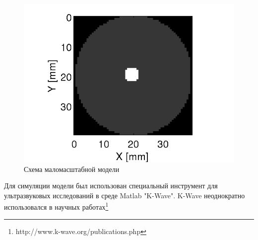 \documentclass[14pt]{matmex-diploma}
\begin{document}
\begin{figure}[h]
\centering
    \includegraphics[width=.4\textwidth]{pics/model.png}
    \caption{Схема маломасштабной модели}
    \label{fig:model_1}
\end{figure}

Для симуляции модели был использован специальный инструмент для ультразвуковых исследований в среде Matlab "K-Wave". K-Wave неоднократно использовался в научных работах\footnote{http://www.k-wave.org/publications.php}\cite{treeby2010k} \\
\end{document}
